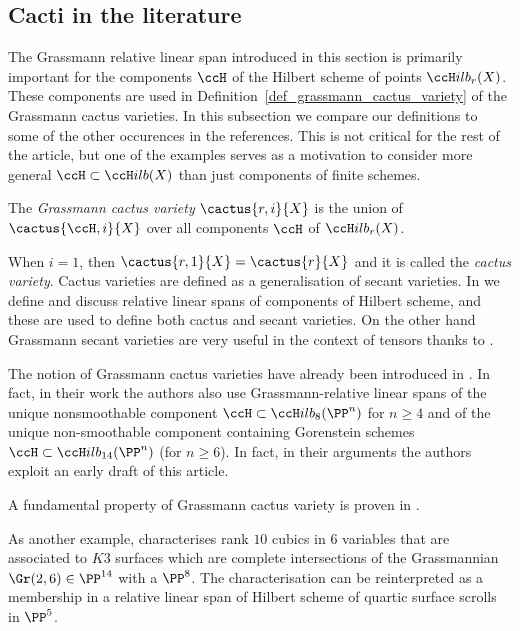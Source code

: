 \documentclass[12pt,a4paper]{article}
\newcommand{\usualHilb}{{\ccH}ilb}
\begin{document}
\subsection{Cacti in the literature}
The Grassmann relative linear span introduced in this section is primarily important for
the components $\ccH$ of the Hilbert scheme of points $\usualHilb_r(X)$.
These components are used in Definition~\ref{def_grassmann_cactus_variety} of the Grassmann cactus varieties.
In this subsection we compare our definitions to some of the other occurences in the references.
This is not critical for the rest of the article, but one of the examples serves as a motivation to consider more general $\ccH\subset \usualHilb(X)$ than just components of finite schemes.

\begin{defin}
\label{def_grassmann_cactus_variety}
The \emph{Grassmann cactus variety} $\cactus{r,i}{X}$ is the union of $\cactus{\ccH,i}{X}$ over all components $\ccH$ of $\usualHilb_r(X)$.
\end{defin}

When $i=1$, then $\cactus{r,1}{X}=\cactus{r}{X}$ and it is  called the \emph{cactus variety}.
Cactus varieties are defined as a generalisation of secant varieties.
In \cite[\S5.6--5.7]{jabu_jelisiejew_finite_schemes_and_secants} we define and discuss relative linear spans of components of Hilbert scheme,
and these are used to define both cactus and secant varieties.
On the other hand Grassmann secant varieties are very useful in the context of tensors thanks to
\cite[Cor.~3.6(iii)]{landsberg_jabu_ranks_of_tensors}.

The notion of Grassmann cactus varieties have already been introduced
in \cite{galazka_mandziuk_rupniewski_distinguishing}.
In fact, in their work the authors also use Grassmann-relative linear spans of the unique nonsmoothable component
$\ccH\subset \usualHilb_{8}(\PP^n)$ for $n\geqslant 4$ and of the unique non-smoothable component containing
Gorenstein schemes $\ccH\subset \usualHilb_{14}(\PP^n)$ (for $n\geqslant 6$).
In fact, in their arguments the authors exploit an early draft of this article.

A fundamental property of Grassmann cactus variety is proven in \cite{nisiabu_jabu_galazka_Grassmann_cactus_and_socle}.

As another example,
\cite[Lem~2.4]{ranestad_voisin_VSP_and_divisors_in_the_moduli_of_cubic_fourfolds}
characterises rank $10$ cubics in $6$ variables that are associated to $K3$ surfaces which are complete intersections of
the Grassmannian $\Gr(2, 6) \in \PP^{14}$ with a $\PP^8$.
The characterisation can be reinterpreted as a membership in a relative linear span of Hilbert scheme of quartic surface scrolls in $\PP^5$.
\end{document}
